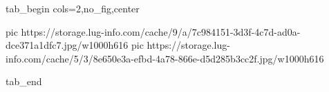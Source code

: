  
 
 
 
 


\ifcmt
  tab_begin cols=2,no_fig,center

     pic https://storage.lug-info.com/cache/9/a/7c984151-3d3f-4c7d-ad0a-dce371a1dfc7.jpg/w1000h616
		 pic https://storage.lug-info.com/cache/5/3/8e650e3a-efbd-4a78-866e-d5d285b3cc2f.jpg/w1000h616

  tab_end
\fi
